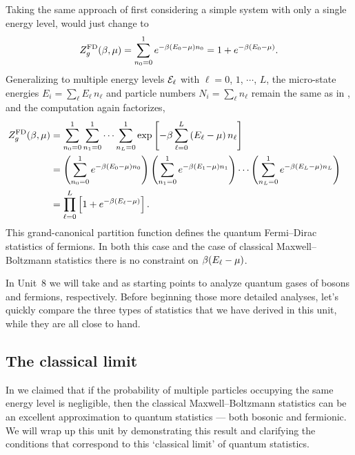 Taking the same approach of first considering a simple system with only a single energy level,  would just change to
\begin{equation*}
  Z_g^{\text{FD}}(\beta, \mu) = \sum_{n_0 = 0}^1 e^{-\beta (E_0 - \mu) n_0} = 1 + e^{-\beta (E_0 - \mu)}.
\end{equation*}
Generalizing to multiple energy levels $\mathcal E_{\ell}$ with $\ell = 0$, $1$, $\cdots$, $L$, the micro-state energies $E_i = \sum_{\ell} E_{\ell} \, n_{\ell}$ and particle numbers $N_i = \sum_{\ell} n_{\ell}$ remain the same as in , and the computation again factorizes,
\begin{align}
  Z_g^{\text{FD}}(\beta, \mu) & = \sum_{n_0 = 0}^1 \sum_{n_1 = 0}^1 \cdots \sum_{n_L = 0}^1 \exp\left[-\beta\sum_{\ell = 0}^L \left(E_{\ell} - \mu\right) n_{\ell}\right] \cr
                 & = \left(\sum_{n_0 = 0}^1 e^{-\beta (E_0 - \mu) n_0}\right) \left(\sum_{n_1 = 0}^1 e^{-\beta (E_1 - \mu) n_1}\right)\cdots \left(\sum_{n_L = 0}^1 e^{-\beta (E_L - \mu) n_L}\right) \cr
                 & = \prod_{\ell = 0}^L \left[1 + e^{-\beta (E_{\ell} - \mu)}\right]. \label{eq:partfunc_FD}
\end{align}
This grand-canonical partition function defines the quantum Fermi--Dirac statistics of fermions.
In both this case and the case of classical Maxwell--Boltzmann statistics there is no constraint on $\beta (E_{\ell} - \mu)$.

In Unit~8 we will take \ZBE and \ZFD as starting points to analyze quantum gases of bosons and fermions, respectively.
Before beginning those more detailed analyses, let's quickly compare the three types of statistics that we have derived in this unit, while they are all close to hand.



\subsection{\label{sec:quantum_classical}The classical limit}
In  we claimed that if the probability of multiple particles occupying the same energy level is negligible, then the classical Maxwell--Boltzmann statistics can be an excellent approximation to quantum statistics --- both bosonic and fermionic.
We will wrap up this unit by demonstrating this result and clarifying the conditions that correspond to this `classical limit' of quantum statistics.

